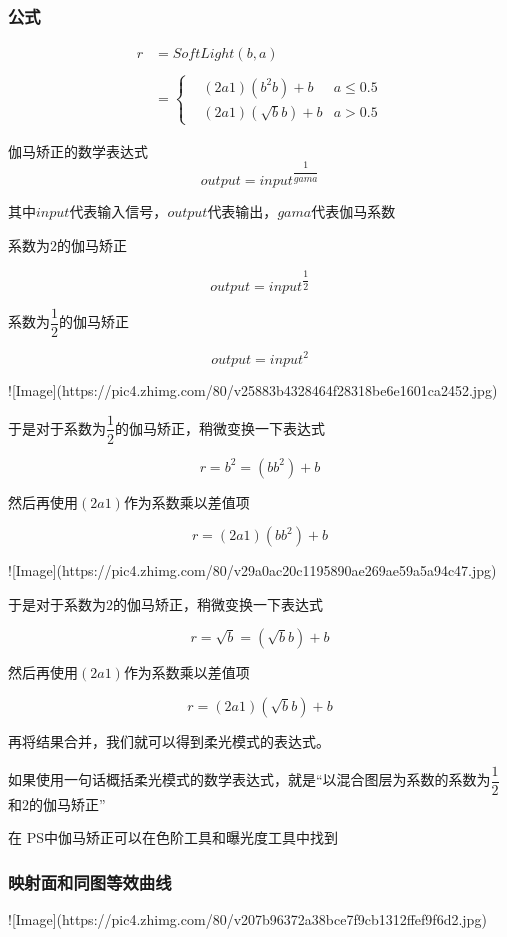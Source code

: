 \subsubsection{ 公式}

$$\begin{aligned}r&= SoftLight(b,a)\\\\&=\left\{\begin{aligned}&(2a1)(b^2b)+b&a\leq0.5\\&(2a1)(\sqrt{b}b)+b&a>0.5\end{aligned}\right.\end{aligned}$$

伽马矫正的数学表达式$$output = input^{\dfrac{1}{gama}}$$

其中$input$代表输入信号，$output$代表输出，$gama$代表伽马系数

系数为$2$的伽马矫正

$$output= input^{\dfrac{1}{2}}$$

系数为$\dfrac{1}{2}$的伽马矫正

$$output= input^{2}$$

![Image](https://pic4.zhimg.com/80/v25883b4328464f28318be6e1601ca2452.jpg)

于是对于系数为$\dfrac{1}{2}$的伽马矫正，稍微变换一下表达式

$$r =b^2= (bb^2) +b$$

然后再使用$(2a1)$作为系数乘以差值项

$$r = (2a1)(bb^2) +b$$

![Image](https://pic4.zhimg.com/80/v29a0ac20c1195890ae269ae59a5a94c47.jpg)

于是对于系数为$2$的伽马矫正，稍微变换一下表达式

$$r =\sqrt{b}= (\sqrt{b}b) +b$$

然后再使用$(2a1)$作为系数乘以差值项

$$r =(2a1)(\sqrt{b}b) +b$$

再将结果合并，我们就可以得到柔光模式的表达式。

如果使用一句话概括柔光模式的数学表达式，就是“以混合图层为系数的系数为$\dfrac{1}{2}$和$2$的伽马矫正”

在 PS中伽马矫正可以在色阶工具和曝光度工具中找到👀

\subsubsection{ 映射面和同图等效曲线}

![Image](https://pic4.zhimg.com/80/v207b96372a38bce7f9cb1312ffef9f6d2.jpg)

